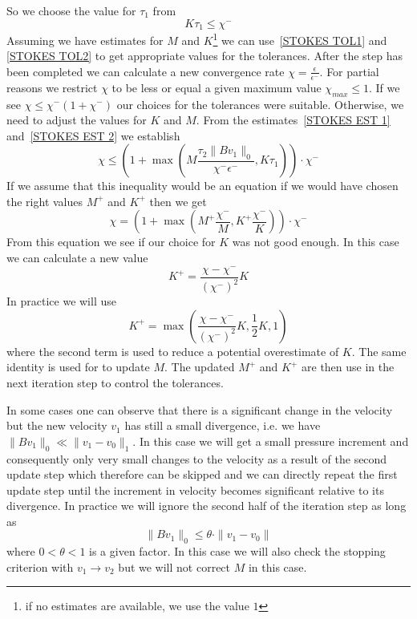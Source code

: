 So we choose the value for $\tau_{1}$ from
\begin{equation} \label{STOKES TOL1}
K \tau_{1} \le \chi^{-}
\end{equation}
Assuming we have estimates for $M$ and $K$\footnote{if no estimates are
available, we use the value $1$} we can use~\ref{STOKES TOL1} and
\ref{STOKES TOL2} to get appropriate values for the tolerances.
After the step has been completed we can calculate a new convergence rate
$\chi =\frac{\epsilon}{\epsilon^{-}}$.
For partial reasons we restrict $\chi$ to be less or equal a given maximum
value $\chi_{max}\le 1$.
If we see $\chi \le \chi^{-} (1+\chi^{-})$ our choices for the tolerances were
suitable. Otherwise, we need to adjust the values for $K$ and $M$.
From the estimates~\ref{STOKES EST 1} and~\ref{STOKES EST 2} we establish
\begin{equation}\label{STOKES EST 3}
\chi \le ( 1 + \max(M \frac{\tau_{2} \|B v_{1}\|_{0}}{\chi^{-} \epsilon^{-}},K \tau_{1}  ) ) \cdot \chi^{-} 
\end{equation}
If we assume that this inequality would be an equation if we would have chosen
the right values $M^{+}$ and $K^{+}$ then we get
\begin{equation}\label{STOKES EST 3b}
\chi =  ( 1 + \max(M^{+} \frac{\chi^{-}}{M},K^{+} \frac{\chi^{-}}{K}) ) \cdot \chi^{-} 
\end{equation}
From this equation we see if our choice for $K$ was not good enough.
In this case we can calculate a new value
 \begin{equation}
K^{+} =  \frac{\chi-\chi^{-}}{(\chi^{-})^2} K
\end{equation}
In practice we will use
 \begin{equation}
K^{+}  = \max(\frac{\chi-\chi^{-}}{(\chi^{-})^2} K,\frac{1}{2}K,1)
\end{equation}
where the second term is used to reduce a potential overestimate of $K$.
The same identity is used for to update $M$. The updated $M^{+}$ and $K^{+}$
are then use in the next iteration step to control the tolerances.

In some cases one can observe that there is a significant change in the
velocity but the new velocity $v_{1}$ has still a small divergence, i.e.
we have $\|Bv_{1}\|_{0} \ll \|v_{1}-v_{0}\|_{1}$.
In this case we will get a small pressure increment and consequently only very
small changes to the velocity as a result of the second update step which
therefore can be skipped and we can directly repeat the first update step
until the increment in velocity becomes significant relative to its divergence.
In practice we will ignore the second half of the iteration step as long as
 \begin{equation}\label{STOKES LARGE BV1}
\|Bv_{1}\|_{0} \le \theta \cdot \|v_{1}-v_{0}\| 
\end{equation}
where $0<\theta<1$ is a given factor. In this case we will also check the
stopping criterion with $v_{1}\rightarrow v_{2}$ but we will not correct $M$
in this case.

